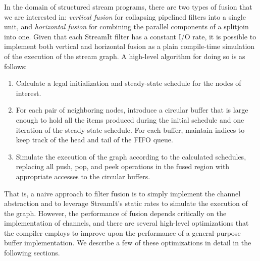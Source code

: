 In the domain of structured stream programs, there are two types of
fusion that we are interested in: {\it vertical fusion} for collapsing
pipelined filters into a single unit, and {\it horizontal fusion} for
combining the parallel components of a splitjoin into one.  Given that
each StreamIt filter has a constant I/O rate, it is possible to
implement both vertical and horizontal fusion as a plain compile-time
simulation of the execution of the stream graph.  A high-level
algorithm for doing so is as follows:
\begin{enumerate}
\item Calculate a legal initialization and steady-state schedule for
the nodes of interest.

\item For each pair of neighboring nodes, introduce a circular buffer
that is large enough to hold all the items produced during the initial
schedule and one iteration of the steady-state schedule.  For each
buffer, maintain indices to keep track of the head and tail of the
FIFO queue.

\item Simulate the execution of the graph according to the calculated
schedules, replacing all push, pop, and peek operations in the fused
region with appropriate accesses to the circular buffers.
\end{enumerate}
That is, a naive approach to filter fusion is to simply implement the
channel abstraction and to leverage StreamIt's static rates to
simulate the execution of the graph.  However, the performance of
fusion depends critically on the implementation of channels, and there
are several high-level optimizations that the compiler employs to
improve upon the performance of a general-purpose buffer
implementation.  We describe a few of these optimizations in detail in
the following sections.

